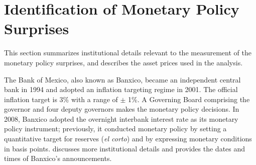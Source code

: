 {%


}{}	%


\section{Identification of Monetary Policy Surprises} \label{sec:mpsidentification}
\iftoggle{toclinks}{\gototoc}{} %

This section summarizes institutional details relevant to the measurement of the monetary policy surprises, and describes the asset prices used in the analysis. 

The Bank of Mexico, also known as Banxico, became an independent central bank in 1994 and adopted an inflation targeting regime in 2001. 
The official inflation target is 3\% with a range of \(\pm\) 1\%. 
A Governing Board comprising the governor and four deputy governors makes the monetary policy decisions.  
In 2008, Banxico adopted the overnight interbank interest rate as its monetary policy instrument; previously, it conducted monetary policy by setting a quantitative target for reserves (\textit{el corto}) and by expressing monetary conditions in basis points. 
\textcite{Solis:FX} discusses more institutional details and provides the dates and times of Banxico's announcements.

